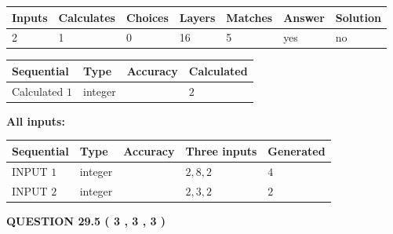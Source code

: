 \documentclass[12pt]{article}
\begin{document}
  
 
 
\noindent{}
 
 
 
   
   
   
   
\noindent\begin{tabular}{|l|l|l|l|l|l|l|}
 \hline
Inputs & Calculates & Choices & Layers & Matches & Answer & Solution \\ \hline
           2  & 
           1  & 
           0
  & 
          16  & 
           5  & 
  yes & 
  no 
  \\ \hline
 \end{tabular}
   
   
   
   
\noindent{}
   
   
  
  
\noindent\begin{tabular}{|l|l|l|l|}
\hline
 Sequential & Type & Accuracy & Calculated \\ 
\hline
 
 
  Calculated $            1 $ & integer &  & 
  $ 2 $ 
 \\  \hline  
 \end{tabular}
   
   
   
   
\noindent\vspace{0.1in}\hspace{-0.08in} {\textbf{\Large{All inputs: }}}
   
   
  
  
\noindent\begin{tabular}{|l|l|l|l|l|}
\hline
 Sequential & Type & Accuracy & Three inputs & Generated \\ 
\hline
 
 
  INPUT $            1 $ & integer &  & $
 2
 , 
 8
 , 
 2
 $ & $ 4 $ 
 \\  \hline  
 
 
  INPUT $            2 $ & integer &  & $
 2
 , 
 3
 , 
 2
 $ & $ 2 $ 
 \\  \hline  
 \end{tabular}
   
   
  
\vspace{0.2in}
  
{\textbf{\Large{QUESTION
29.5 
 (           3 ,           3 ,           3 )
}}}
  
\end{document}
